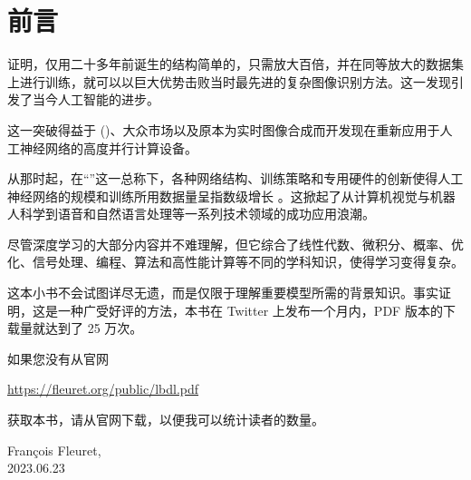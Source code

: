 
\chapter*{前言}

\cite{nips-1502.c399862d3b9d6b76c8436e924a68c45b} 证明，仅用二十多年前\citep{lecun-89e}诞生的结构简单的，只需放大百倍，并在同等放大的数据集上进行训练，就可以以巨大优势击败当时最先进的复杂图像识别方法。这一发现引发了当今人工智能的进步。

这一突破得益于 ()、大众市场以及原本为实时图像合成而开发现在重新应用于人工神经网络的高度并行计算设备。

从那时起，在``''这一总称下，各种网络结构、训练策略和专用硬件的创新使得人工神经网络的规模和训练所用数据量呈指数级增长 \cite{arxiv-2202.05924}。这掀起了从计算机视觉与机器人科学到语音和自然语言处理等一系列技术领域的成功应用浪潮。

尽管深度学习的大部分内容并不难理解，但它综合了线性代数、微积分、概率、优化、信号处理、编程、算法和高性能计算等不同的学科知识，使得学习变得复杂。

这本小书不会试图详尽无遗，而是仅限于理解重要模型所需的背景知识。事实证明，这是一种广受好评的方法，本书在 Twitter 上发布一个月内，PDF 版本的下载量就达到了 25 万次。

如果您没有从官网 
\begin{center}
\href{https://fleuret.org/public/lbdl.pdf}{https://fleuret.org/public/lbdl.pdf}
\end{center}
获取本书，请从官网下载，以便我可以统计读者的数量。

\begin{flushright}
  François Fleuret,\\
  2023.06.23
\end{flushright}